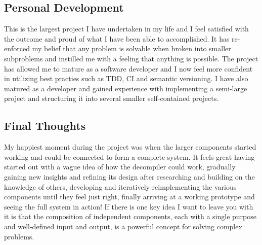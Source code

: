 \subsection{Personal Development}

This is the largest project I have undertaken in my life and I feel satisfied with the outcome and proud of what I have been able to accomplished. It has re-enforced my belief that any problem is solvable when broken into smaller subproblems and instilled me with a feeling that anything is possible. The project has allowed me to mature as a software developer and I now feel more confident in utilizing best practies such as TDD, CI and semantic versioning. I have also matured as a developer and gained experience with implementing a semi-large project and structuring it into several smaller self-contained projects.


\subsection{Final Thoughts}

My happiest moment during the project was when the larger components started working and could be connected to form a complete system. It feels great having started out with a vague idea of how the decompiler could work, gradually gaining new insights and refining its design after researching and building on the knowledge of others, developing and iteratively reimplementing the various components until they feel just right, finally arriving at a working prototype and seeing the full system in action! If there is one key idea I want to leave you with it is that the composition of independent components, each with a single purpose and well-defined input and output, is a powerful concept for solving complex problems.
